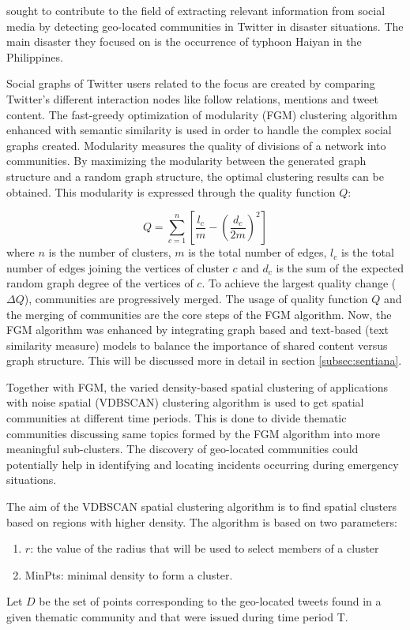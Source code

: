  sought to contribute to the field of extracting relevant information from social media by detecting geo-located communities in Twitter in disaster situations. The main disaster they focused on is the occurrence of typhoon Haiyan in the Philippines. 


Social graphs of Twitter users related to the focus are created by comparing Twitter's different interaction nodes like follow relations, mentions and tweet content. The fast-greedy optimization of modularity (FGM) clustering algorithm enhanced with semantic similarity is used in order to handle the complex social graphs created. Modularity measures the quality of divisions of a network into communities. By maximizing the modularity between the generated graph structure and a random graph structure, the optimal clustering results can be obtained. This modularity is expressed through the quality function $Q$:


\begin{equation}
Q = \sum_{c = 1}^{n} \left [ \frac{l_c}{m} - \left (\frac{d_c}{2m} \right )^2 \right ]
\end{equation}where $n$ is the number of clusters, $m$ is the total number of edges, $l_c$ is the total number of edges joining the vertices of cluster $c$ and $d_c$ is the sum of the expected random graph degree of the vertices of $c$. To achieve the largest quality change ($\Delta$$Q$), communities are progressively merged. The usage of quality function $Q$ and the merging of communities are the core steps of the FGM algorithm. Now, the FGM algorithm was enhanced by integrating graph based and text-based (text similarity measure) models to balance the importance of shared content versus graph structure. This will be discussed more in detail in section \ref{subsec:sentiana}.


Together with FGM, the varied density-based spatial clustering of applications with noise spatial (VDBSCAN) clustering algorithm is used to get spatial communities at different time periods. This is done to divide thematic communities discussing same topics formed by the FGM algorithm into more meaningful sub-clusters. The discovery of geo-located communities could potentially help in identifying and locating incidents occurring during emergency situations.


The aim of the VDBSCAN spatial clustering algorithm is to find spatial clusters based on regions with higher density. The algorithm is based on two parameters:
\begin{enumerate}
	\item $r$: the value of the radius that will be used to select members of a cluster
	\item MinPts: minimal density to form a cluster.
\end{enumerate}
Let $D$ be the set of points corresponding to the geo-located tweets found in a given thematic community and that were issued during time period T.


